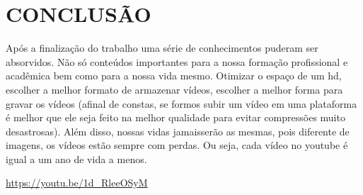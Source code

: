 \captionsetup{justification=centering,margin=0cm}

\chapter[CONCLUSÃO]{CONCLUSÃO}
\label{cap:conclusão}

Após a finalização do trabalho uma série de conhecimentos puderam ser absorvidos. Não só conteúdos importantes para a nossa formação profissional e acadêmica bem como para a nossa vida mesmo. Otimizar o espaço de um hd, escolher a melhor formato de armazenar vídeos, escolher a melhor forma para gravar os vídeos (afinal de constas, se formos subir um vídeo em uma plataforma é melhor que ele seja feito na melhor qualidade para evitar compressões muito desastrosas). Além disso, nossas vidas jamaisserão as mesmas, pois diferente de imagens, os vídeos estão sempre com perdas. Ou seja, cada vídeo no youtube é igual a um ano de vida a menos. 

\url{https://youtu.be/1d_RleeOSyM}
